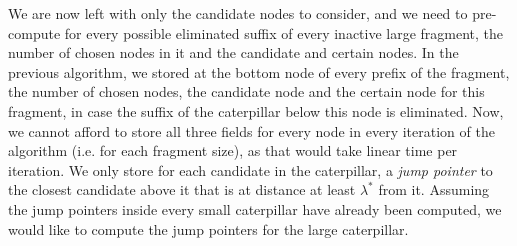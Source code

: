 \documentclass[11pt,a4paper]{article}
\theoremstyle{definition}
\theoremstyle{remark}
\begin{document}
We are now left with only the candidate nodes to consider, and we need to pre-compute for every possible eliminated suffix of every inactive large fragment, the number of chosen nodes in it and the candidate and certain nodes. In the previous algorithm, we stored at the bottom node of every prefix of the fragment, the number of chosen nodes, the candidate node and the certain node for this fragment, in case the suffix of the caterpillar below this node is eliminated. Now, we cannot afford to store all three fields for every node in every iteration of the algorithm (i.e. for each fragment size), as that would take linear time per iteration. We only store for each candidate in the caterpillar, a \emph{jump pointer} to the closest candidate above it that is at distance at least $\lambda ^*$ from it. Assuming the jump pointers inside every small caterpillar have already been computed, we would like to compute the jump pointers for the large caterpillar.
\end{document}
